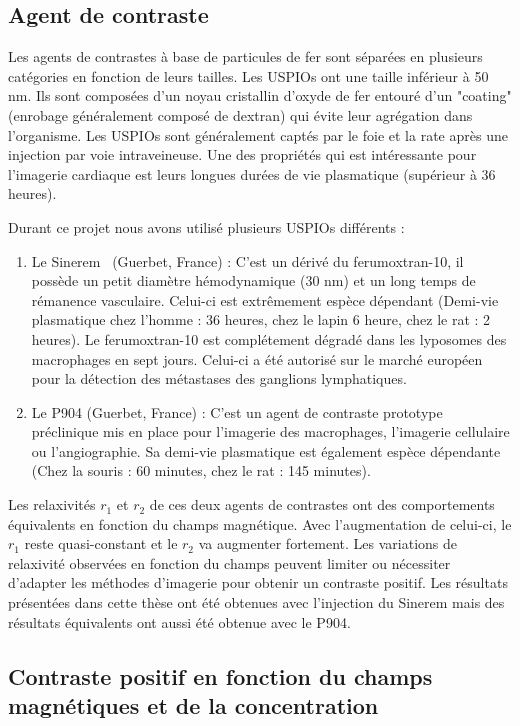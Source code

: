 \subsection{Agent de contraste}

Les agents de contrastes à base de particules de fer sont séparées en plusieurs catégories en fonction de leurs tailles. Les USPIOs ont une taille inférieur à 50 nm. Ils sont composées d'un noyau cristallin d'oxyde de fer entouré d'un "coating" (enrobage généralement composé de dextran) qui évite leur agrégation dans l'organisme. Les USPIOs sont généralement captés par le foie et la rate après une injection par voie intraveineuse. Une des propriétés qui est intéressante pour l'imagerie cardiaque est leurs longues durées de vie plasmatique (supérieur à 36 heures).

Durant ce projet nous avons utilisé plusieurs USPIOs différents : 
\begin{enumerate}
\item Le Sinerem \textregistered \ (Guerbet, France) : C'est un dérivé du ferumoxtran-10, il possède un petit diamètre hémodynamique (30 nm) et un long temps de rémanence vasculaire. Celui-ci est extrêmement espèce dépendant (Demi-vie plasmatique chez l'homme : 36 heures, chez le lapin 6 heure, chez le rat : 2 heures). Le ferumoxtran-10 est complétement dégradé dans les lyposomes des macrophages en sept jours. Celui-ci a été autorisé sur le marché européen pour la détection des métastases des ganglions lymphatiques.

\item Le P904 (Guerbet, France) : C'est un agent de contraste prototype préclinique mis en place pour l'imagerie des macrophages, l'imagerie cellulaire ou l'angiographie. Sa demi-vie plasmatique est également espèce dépendante (Chez la souris : 60 minutes, chez le rat : 145 minutes).
\end{enumerate}

Les relaxivités $r_1$ et $r_2$ de ces deux agents de contrastes ont des comportements équivalents en fonction du champs magnétique. Avec l'augmentation de celui-ci, le $r_1$ reste quasi-constant et le $r_2$ va augmenter fortement. Les variations de relaxivité observées en fonction du champs peuvent limiter ou nécessiter d'adapter les méthodes d'imagerie pour obtenir un contraste positif. Les résultats présentées dans cette thèse ont été obtenues avec l'injection du Sinerem mais des résultats équivalents ont aussi été obtenue avec le P904.

\subsection{Contraste positif en fonction du champs magnétiques et de la concentration}

